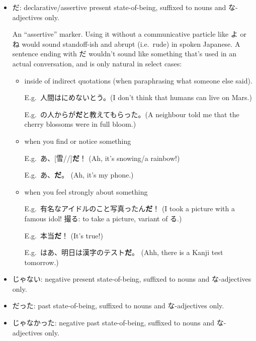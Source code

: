 \documentclass[../nihongo-gakushuu-kyouzai.tex]{subfiles}
\begin{document}
\begin{itemize}
    \item だ: declarative/assertive present state-of-being, suffixed to nouns and な-adjectives only.

    An ``assertive'' marker. Using it without a communicative particle like よ or ね would sound standoff-ish and abrupt (i.e.\ rude) in spoken Japanese. A sentence ending with だ wouldn't sound like something that's used in an actual conversation, and is only natural in select cases:
    \begin{itemize}
        \item inside of indirect quotations (when paraphrasing what someone else said).

        E.g.\ 人間はにめないとう。(I don't think that humans can live on Mars.)

        E.g.\ の人からが\textbf{だ}と教えてもらった。(A neighbour told me that the cherry blossoms were in full bloom.)
        \item when you find or notice something

        E.g.\ あ、[雪//]\textbf{だ}！ (Ah, it's snowing/a rainbow!)

        E.g.\ あ、\textbf{だ}。 (Ah, it's my phone.)

        \item when you feel strongly about something

        E.g.\ 有名なアイドルのこと写真ったん\textbf{だ}！ (I took a picture with a famous idol! 撮る: to take a picture, variant of る.)

        E.g.\ 本当\textbf{だ}！ (It's true!)

        E.g.\ はあ、明日は漢字のテスト\textbf{だ}。 (Ahh, there is a Kanji test tomorrow.)
    \end{itemize}


    \item じゃない: negative present state-of-being, suffixed to nouns and な-adjectives only.


    \item だった: past state-of-being, suffixed to nouns and な-adjectives only.
    \item じゃなかった: negative past state-of-being, suffixed to nouns and な-adjectives only.

\end{itemize}
\end{document}
